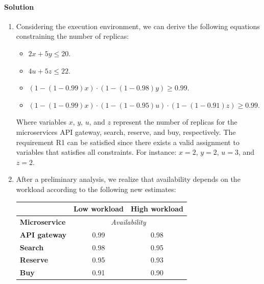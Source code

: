\paragraph*{Solution}
\begin{enumerate}
    \item Considering the execution environment, we can derive the following equations constraining the number of replicas:
        \begin{itemize}
            \item $2x + 5y \leq 20$.
            \item $4u + 5z \leq 22$.
            \item $(1 - (1 - 0.99)x) \cdot (1 - (1 - 0.98)y) \geq 0.99$.
            \item $(1 - (1 - 0.99)x) \cdot (1 - (1 - 0.95)u) \cdot (1 - (1 - 0.91)z) \geq 0.99$. 
        \end{itemize}
        Where variables $x$, $y$, $u$, and $z$ represent the number of replicas for the microservices API gateway, search, reserve, and buy, respectively.
        The requirement R1 can be satisfied since there exists a valid assignment to variables that satisfies all constraints. 
        For instance: $x = 2$, $y = 2$, $u = 3$, and $z = 2$. 
    \item After a preliminary analysis, we realize that availability depends on the workload according to the following new estimates:
        \begin{table}[H]
            \centering
            \begin{tabular}{l|cc|}
            \cline{2-3}
            \multicolumn{1}{c|}{}                       & \textbf{Low workload} & \textbf{High workload} \\ \hline
            \multicolumn{1}{|l|}{\textbf{Microservice}} & \multicolumn{2}{c|}{\textit{Availability}}                                                     \\ \hline
            \multicolumn{1}{|l|}{\textbf{API gateway}}  & 0.99                                         & 0.98                                            \\
            \multicolumn{1}{|l|}{\textbf{Search}}       & 0.98                                         & 0.95                                            \\
            \multicolumn{1}{|l|}{\textbf{Reserve}}      & 0.95                                         & 0.93                                            \\
            \multicolumn{1}{|l|}{\textbf{Buy}}          & 0.91                                         & 0.90                                            \\ \hline

\end{tabular}
\end{table}
\end{enumerate}
